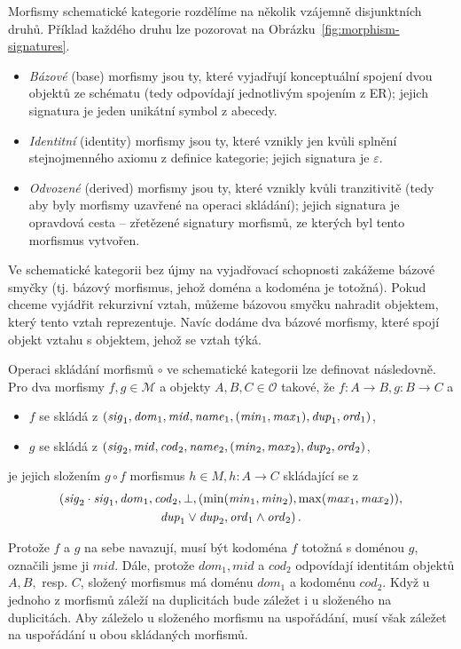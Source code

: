Morfismy schematické kategorie rozdělíme na několik vzájemně disjunktních druhů.
Příklad každého druhu lze pozorovat na Obrázku~\ref{fig:morphism-signatures}.
\begin{itemize}
  \item \emph{Bázové} (base) morfismy jsou ty, které vyjadřují konceptuální spojení dvou objektů ze schématu (tedy odpovídají jednotlivým spojením z ER); jejich signatura je jeden unikátní symbol z abecedy.
  \item \emph{Identitní} (identity) morfismy jsou ty, které vznikly jen kvůli splnění stejnojmenného axiomu z definice kategorie; jejich signatura je $\varepsilon$.
  \item \emph{Odvozené} (derived) morfismy jsou ty, které vznikly kvůli tranzitivitě (tedy aby byly morfismy uzavřené na operaci skládání); jejich signatura je opravdová cesta -- zřetězené signatury morfismů, ze kterých byl tento morfismus vytvořen.
\end{itemize}

Ve schematické kategorii bez újmy na vyjadřovací schopnosti zakážeme bázové smyčky (tj. bázový morfismus, jehož doména a kodoména je totožná).
Pokud chceme vyjádřit rekurzivní vztah, můžeme bázovou smyčku nahradit objektem, který tento vztah reprezentuje.
Navíc dodáme dva bázové morfismy, které spojí objekt vztahu s objektem, jehož se vztah týká.

Operaci skládání morfismů $\circ$ ve schematické kategorii lze definovat následovně.
Pro dva morfismy $f,g\in\mathcal M$ a objekty $A,B,C\in \mathcal O$ takové, že $f\colon A\to B, g\colon B\to C$ a
\begin{itemize}
  \item $f$ se skládá z $(\mathit{sig}_1, \mathit{dom}_1, \mathit{mid}, \mathit{name}_1, (\mathit{min}_1, \mathit{max}_1), \mathit{dup}_1, \mathit{ord}_1)$,
  \item $g$ se skládá z $(\mathit{sig}_2, \mathit{mid}, \mathit{cod}_2, \mathit{name}_2, (\mathit{min}_2, \mathit{max}_2), \mathit{dup}_2, \mathit{ord}_2)$,
\end{itemize}
je jejich složením $g\circ f$ morfismus $h\in M, h\colon A\to C$ skládající se z
\begin{multline*}
  (\mathit{sig}_2\cdot \mathit{sig}_1, \mathit{dom}_1, \mathit{cod}_2, \bot, (\min(\mathit{min}_1, \mathit{min}_2), \max(\mathit{max}_1, \mathit{max}_2)),\\
  \mathit{dup}_1 \lor \mathit{dup}_2, \mathit{ord}_1\land \mathit{ord}_2)\,.
\end{multline*}

Protože $f$ a $g$ na sebe navazují, musí být kodoména $f$ totožná s doménou $g$, označili jsme ji $\mathit{mid}$.
Dále, protože $dom_1, \mathit{mid}$ a $cod_2$ odpovídají identitám objektů $A, B, $ resp. $C$, složený morfismus má doménu $dom_1$ a kodoménu $cod_2$.
Když u jednoho z morfismů záleží na duplicitách bude záležet i u složeného na duplicitách.
Aby záleželo u složeného morfismu na uspořádání, musí však záležet na uspořádání u obou skládaných morfismů.

